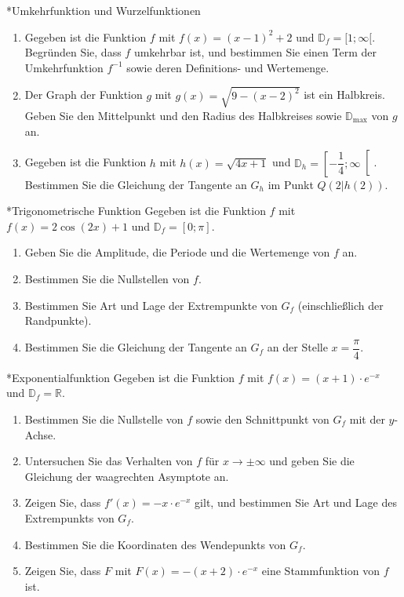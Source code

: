 \begin{uebung}*{Umkehrfunktion und Wurzelfunktionen}
\begin{enumerate}[label=\alph*)]
  \item Gegeben ist die Funktion $f$ mit $f(x) = (x-1)^2+2$ und $\mathds{D}_f = [1;\infty[$. Begründen Sie, dass $f$ umkehrbar ist, und bestimmen Sie einen Term der Umkehrfunktion $f^{-1}$ sowie deren Definitions- und Wertemenge.
  \item Der Graph der Funktion $g$ mit $g(x) = \sqrt{9-(x-2)^2}$ ist ein Halbkreis. Geben Sie den Mittelpunkt und den Radius des Halbkreises sowie $\mathds{D}_{\text{max}}$ von $g$ an.
  \item Gegeben ist die Funktion $h$ mit $h(x) = \sqrt{4x+1}$ und $\mathds{D}_h = \left[-\dfrac{1}{4};\infty\right[$. Bestimmen Sie die Gleichung der Tangente an $G_h$ im Punkt $Q(2|h(2))$.
\end{enumerate}
\end{uebung}

\begin{uebung}*{Trigonometrische Funktion}
Gegeben ist die Funktion $f$ mit $f(x) = 2\cos{(2x)}+1$ und $\mathds{D}_f = [0;\pi]$.
\begin{enumerate}[label=\alph*)]
  \item Geben Sie die Amplitude, die Periode und die Wertemenge von $f$ an.
  \item Bestimmen Sie die Nullstellen von $f$.
  \item Bestimmen Sie Art und Lage der Extrempunkte von $G_f$ (einschließlich der Randpunkte).
  \item Bestimmen Sie die Gleichung der Tangente an $G_f$ an der Stelle $x=\dfrac{\pi}{4}$.
\end{enumerate}
\end{uebung}

\begin{uebung}*{Exponentialfunktion}
Gegeben ist die Funktion $f$ mit $f(x) = (x+1)\cdot e^{-x}$ und $\mathds{D}_f = \mathds{R}$.
\begin{enumerate}[label=\alph*)]
  \item Bestimmen Sie die Nullstelle von $f$ sowie den Schnittpunkt von $G_f$ mit der $y$-Achse.
  \item Untersuchen Sie das Verhalten von $f$ für $x\longrightarrow\pm\infty$ und geben Sie die Gleichung der waagrechten Asymptote an.
  \item Zeigen Sie, dass $f'(x) = -x\cdot e^{-x}$ gilt, und bestimmen Sie Art und Lage des Extrempunkts von $G_f$.
  \item Bestimmen Sie die Koordinaten des Wendepunkts von $G_f$.
  \item Zeigen Sie, dass $F$ mit $F(x) = -(x+2)\cdot e^{-x}$ eine Stammfunktion von $f$ ist.
\end{enumerate}
\end{uebung}

